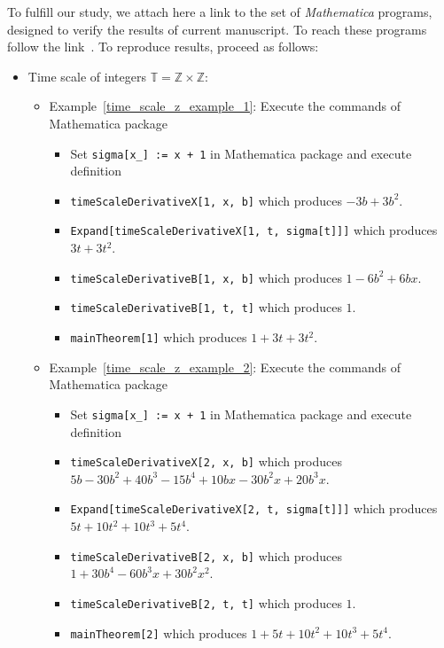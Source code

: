 To fulfill our study, we attach here a link to the set of \emph{Mathematica} programs, designed to verify the results of current manuscript.
To reach these programs follow the link~\cite{kolosov2022mathematica}.
To reproduce results, proceed as follows:
\begin{itemize}
    \setlength\itemsep{1em}
    \item Time scale of integers $\mathbb{T} = \mathbb{Z} \times \mathbb{Z}$:
    \begin{itemize}
        \setlength\itemsep{0.5em}
        \item Example~\ref{time_scale_z_example_1}:
        Execute the commands of Mathematica package
        \begin{itemize}
            \item Set \texttt{sigma[x\_] := x + 1} in Mathematica package and execute definition
            \item \texttt{timeScaleDerivativeX[1, x, b]} which produces $-3 b + 3 b^2$.
            \item \texttt{Expand[timeScaleDerivativeX[1, t, sigma[t]]]} which produces $3 t + 3 t^2$.
            \item \texttt{timeScaleDerivativeB[1, x, b]} which produces $1 - 6 b^2 + 6 b x$.
            \item \texttt{timeScaleDerivativeB[1, t, t]} which produces $1$.
            \item \texttt{mainTheorem[1]} which produces $1 + 3 t + 3 t^2$.
        \end{itemize}
        \item Example~\ref{time_scale_z_example_2}:
        Execute the commands of Mathematica package
        \begin{itemize}
            \item Set \texttt{sigma[x\_] := x + 1} in Mathematica package and execute definition
            \item \texttt{timeScaleDerivativeX[2, x, b]} which produces
            $5 b - 30 b^2 + 40 b^3 - 15 b^4 + 10 b x - 30 b^2 x + 20 b^3 x$.
            \item \texttt{Expand[timeScaleDerivativeX[2, t, sigma[t]]]} which produces $5 t + 10 t^2 + 10 t^3 + 5 t^4$.
            \item \texttt{timeScaleDerivativeB[2, x, b]} which produces $1 + 30 b^4 - 60 b^3 x + 30 b^2 x^2$.
            \item \texttt{timeScaleDerivativeB[2, t, t]} which produces $1$.
            \item \texttt{mainTheorem[2]} which produces $1 + 5 t + 10 t^2 + 10 t^3 + 5 t^4$.

\end{itemize}
\end{itemize}
\end{itemize}
